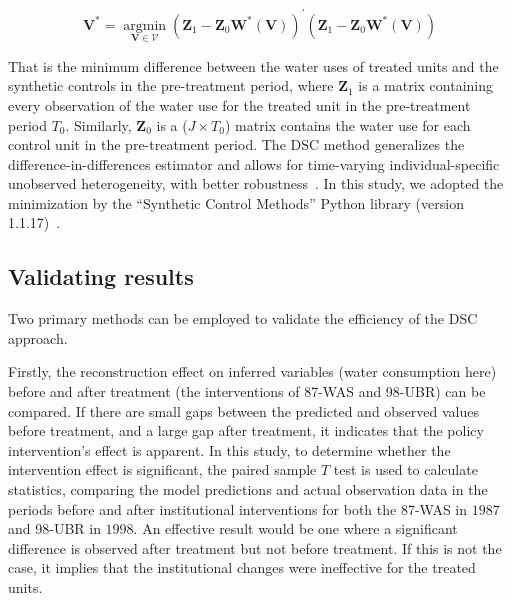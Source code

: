 \begin{equation}
    \mathbf{V}^{*}=\underset{\mathbf{V} \in \mathcal{V}}{\operatorname{argmin}}\left(\mathbf{Z}_{1}-\mathbf{Z}_{0} \mathbf{W}^{*}(\mathbf{V})\right)^{\prime}\left(\mathbf{Z}_{1}-\mathbf{Z}_{0} \mathbf{W}^{*}(\mathbf{V})\right)
\end{equation}

That is the minimum difference between the water uses of treated units and the synthetic controls in the pre-treatment period, where $\mathbf{Z}_{1}$ is a matrix containing every observation of the water use for the treated unit in the pre-treatment period $T_0$.
Similarly, $\mathbf{Z}_{0}$ is a ($J \times T_0$) matrix contains the water use for each control unit in the pre-treatment period.
The DSC method generalizes the difference-in-differences estimator and allows for time-varying individual-specific unobserved heterogeneity, with better robustness~\cite{billmeier2013, smith2015}.
In this study, we adopted the minimization by the ``Synthetic Control Methods'' Python library (version 1.1.17)~\cite{engelbrektson2023}.

\subsection{Validating results}\label{sec:robustness}

Two primary methods can be employed to validate the efficiency of the DSC approach.

Firstly, the reconstruction effect on inferred variables (water consumption here) before and after treatment (the interventions of 87-WAS and 98-UBR) can be compared.
If there are small gaps between the predicted and observed values before treatment, and a large gap after treatment, it indicates that the policy intervention's effect is apparent.
In this study, to determine whether the intervention effect is significant, the paired sample $T$ test is used to calculate statistics, comparing the model predictions and actual observation data in the periods before and after institutional interventions for both the 87-WAS in $1987$ and 98-UBR in $1998$.
An effective result would be one where a significant difference is observed after treatment but not before treatment. If this is not the case, it implies that the institutional changes were ineffective for the treated units.

